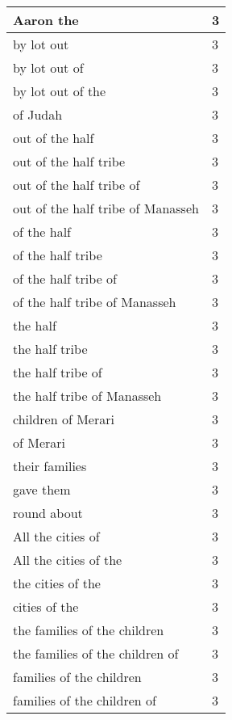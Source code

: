 \begin{center}
\begin{longtable}{|p{3.0in}|p{0.5in}|}
Aaron the & 3\\ \hline 
by lot out & 3\\ \hline 
by lot out of & 3\\ \hline 
by lot out of the & 3\\ \hline 
of Judah & 3\\ \hline 
out of the half & 3\\ \hline 
out of the half tribe & 3\\ \hline 
out of the half tribe of & 3\\ \hline 
out of the half tribe of Manasseh & 3\\ \hline 
of the half & 3\\ \hline 
of the half tribe & 3\\ \hline 
of the half tribe of & 3\\ \hline 
of the half tribe of Manasseh & 3\\ \hline 
the half & 3\\ \hline 
the half tribe & 3\\ \hline 
the half tribe of & 3\\ \hline 
the half tribe of Manasseh & 3\\ \hline 
children of Merari & 3\\ \hline 
of Merari & 3\\ \hline 
their families & 3\\ \hline 
gave them & 3\\ \hline 
round about & 3\\ \hline 
All the cities of & 3\\ \hline 
All the cities of the & 3\\ \hline 
the cities of the & 3\\ \hline 
cities of the & 3\\ \hline 
the families of the children & 3\\ \hline 
the families of the children of & 3\\ \hline 
families of the children & 3\\ \hline 
families of the children of & 3\\ \hline 
\end{longtable}
\end{center}





